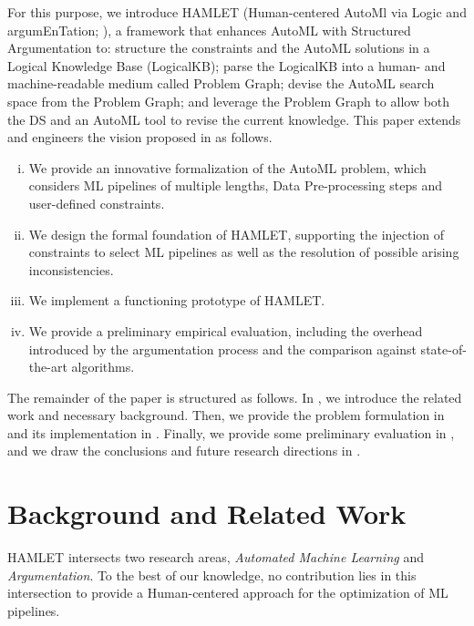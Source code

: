 For this purpose, we introduce HAMLET (Human-centered AutoMl via Logic and argumEnTation; ), a framework that enhances AutoML with Structured Argumentation to:
structure the constraints and the AutoML solutions in a Logical Knowledge Base (LogicalKB);
parse the LogicalKB into a human- and machine-readable medium called Problem Graph;
devise the AutoML search space from the Problem Graph;
and leverage the Problem Graph to allow both the DS and an AutoML tool to revise the current knowledge.
This paper extends and engineers the vision proposed in \cite{DBLP:conf/edbt/GiovanelliP22} as follows.
\begin{enumerate}[(i)]
    \item We provide an innovative formalization of the AutoML problem, which considers ML pipelines of multiple lengths, Data Pre-processing steps and user-defined constraints.
    \item We design the formal foundation of HAMLET, supporting the injection of constraints to select ML pipelines as well as the resolution of possible arising inconsistencies.
    \item We implement a functioning prototype of HAMLET.
    \item We provide a preliminary empirical evaluation, including the overhead introduced by the argumentation process and the comparison against state-of-the-art algorithms. 
\end{enumerate}

The remainder of the paper is structured as follows. In , we introduce the related work and necessary background. Then, we provide the problem formulation in  and its implementation in .
Finally, we provide some preliminary evaluation in , and we draw the conclusions and future research directions in .

\section{Background and Related Work}\label{hamlet-sec:related}
HAMLET intersects two research areas, \emph{Automated Machine Learning} and \emph{Argumentation}. 
To the best of our knowledge, no contribution lies in this intersection to provide a Human-centered approach for the optimization of ML pipelines.

